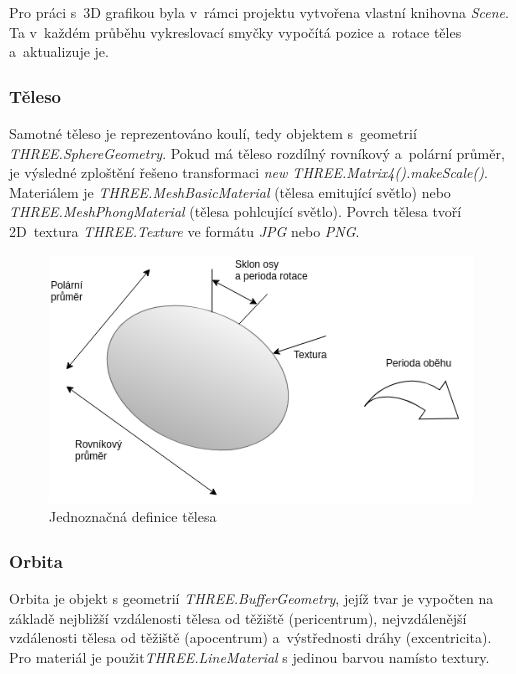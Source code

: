 \documentclass[a4paper,12pt]{article}
\begin{document}
Pro práci s~3D grafikou byla v~rámci projektu vytvořena vlastní knihovna \textit{Scene}. Ta v~každém průběhu vykreslovací smyčky vypočítá pozice a~rotace těles a~aktualizuje je.



\subsubsection{Těleso}

Samotné těleso je reprezentováno koulí, tedy objektem s~geometrií \textit{THREE.SphereGeometry}. Pokud má těleso rozdílný rovníkový a~polární průměr, je výsledné zploštění řešeno transformaci \textit{new THREE.Matrix4().makeScale()}. Materiálem je \textit{THREE.MeshBasicMaterial} (tělesa emitující světlo) nebo \textit{THREE.MeshPhongMaterial} (tělesa pohlcující světlo). Povrch tělesa tvoří 2D~textura \textit{THREE.Texture} ve formátu \textit{JPG} nebo \textit{PNG}.

\begin{figure}[H]
\begin{center}
\includegraphics[width=370pt]{Images/BodyData.png}
\caption[Jednoznačná definice tělesa]{Jednoznačná definice tělesa \footnotemark[1]}
\end{center}
\end{figure}


\subsubsection{Orbita}

Orbita je objekt s geometrií \textit{THREE.BufferGeometry}, jejíž tvar je vypočten na základě nejbližší vzdálenosti tělesa od těžiště (pericentrum), nejvzdálenější vzdálenosti tělesa od těžiště (apocentrum) a~výstřednosti dráhy (excentricita). Pro materiál je použit\newline \textit{THREE.LineMaterial} s jedinou barvou namísto textury.
\end{document}
